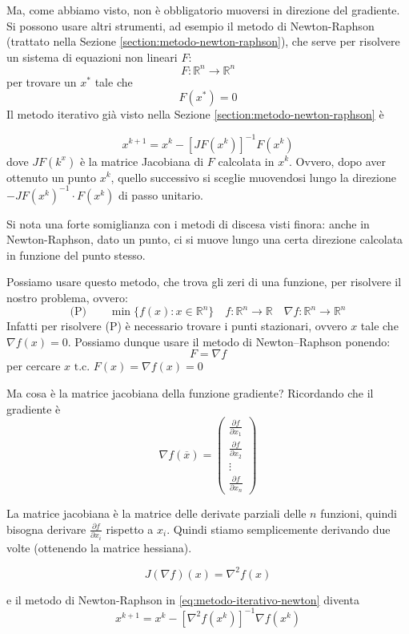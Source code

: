 Ma, come abbiamo visto, non \`e obbligatorio muoversi in direzione del
gradiente. Si possono usare altri strumenti, ad esempio il metodo di
Newton-Raphson (trattato nella Sezione \ref{section:metodo-newton-raphson}),
che serve per risolvere un sistema di equazioni non lineari $F$:
$$ F:\mathbb{R}^{n} \rightarrow \mathbb{R}^n$$
per trovare un $x^*$ tale che
$$ F(x^*) =0$$
Il metodo iterativo gi\`a visto nella Sezione
\ref{section:metodo-newton-raphson} \`e

\begin{equation}
\label{eq:metodo-iterativo-newton} x^{k+1} = x^{k} - [JF(x^{k})]^{-1}
F(x^{k})
\end{equation} dove $JF(k^x)$ \`e la matrice Jacobiana di $F$ calcolata
in $x^k$. Ovvero, dopo aver ottenuto un punto $x^k$, quello successivo
si sceglie muovendosi lungo la direzione $-JF(x^k)^{-1}\cdot F(x^k)$
di passo unitario.

Si nota una forte somiglianza con i metodi di discesa visti finora:
anche in Newton-Raphson, dato un punto, ci si muove lungo una certa
direzione calcolata in funzione del punto stesso.

Possiamo usare questo metodo, che trova gli zeri di una funzione, per risolvere il
nostro problema, ovvero:
$$ \text{(P)}\qquad \min\{f(x): x \in \mathbb{R}^{n} \} \quad f: \mathbb{R}^{n} \rightarrow \mathbb{R} \quad \nabla f: \mathbb{R}^{n} \rightarrow \mathbb{R}^{n}$$
Infatti per risolvere (P) è necessario trovare i punti stazionari, ovvero $x$ tale che $ \nabla f(x) = 0$. Possiamo dunque usare il metodo di Newton--Raphson ponendo:
$$ F = \nabla f$$
per cercare $x \text{ t.c. } F(x) = \nabla f(x) = 0$

Ma cosa \`e la matrice jacobiana della funzione gradiente? Ricordando
che il gradiente \`e
$$\nabla f(\overline{x}) = \left(
\begin{array}{c}\frac{\partial f}{\partial x_1}\\ \frac{\partial
f}{\partial x_2}\\ \vdots\\ \frac{\partial f}{\partial x_n}
\end{array} \right)$$

La matrice jacobiana \`e la matrice delle derivate parziali delle $n$
funzioni, quindi bisogna derivare $\frac{\partial f}{\partial x_i}$
rispetto a $x_i$. Quindi stiamo semplicemente derivando due volte
(ottenendo la matrice hessiana).

$$J(\nabla f)(x) = \nabla^{2} f(x) $$

e il metodo di Newton-Raphson in \ref{eq:metodo-iterativo-newton}
diventa
$$ x^{k+1} = x^{k} - [ \nabla^{2}f(x^{k})]^{-1} \nabla f(x^{k})$$

